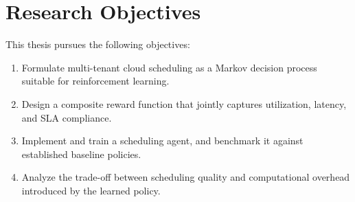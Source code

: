 \section{Research Objectives}
This thesis pursues the following objectives:
\begin{enumerate}[label=\textbf{O\arabic*.}, leftmargin=2.2em]
  \item Formulate multi-tenant cloud scheduling as a Markov decision process
        suitable for reinforcement learning.
  \item Design a composite reward function that jointly captures
        utilization, latency, and SLA compliance.
  \item Implement and train a scheduling agent, and benchmark it against
        established baseline policies.
  \item Analyze the trade-off between scheduling quality and computational
        overhead introduced by the learned policy.
\end{enumerate}
